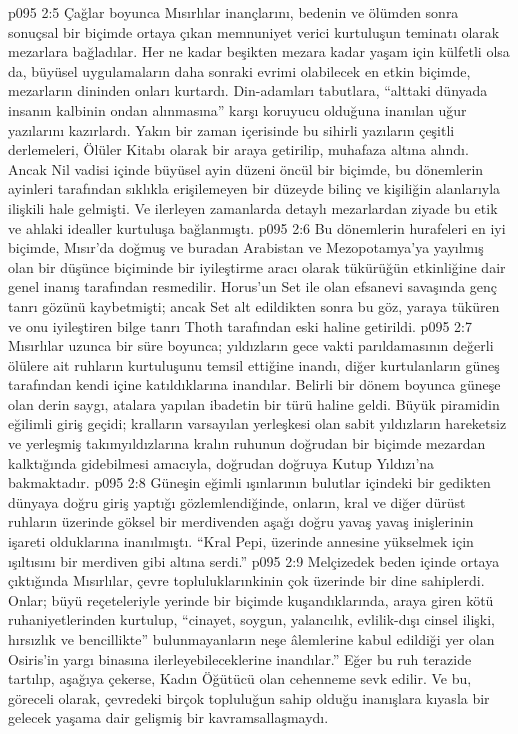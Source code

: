 \vs p095 2:5 Çağlar boyunca Mısırlılar inançlarını, bedenin ve ölümden sonra sonuçsal bir biçimde ortaya çıkan memnuniyet verici kurtuluşun teminatı olarak mezarlara bağladılar. Her ne kadar beşikten mezara kadar yaşam için külfetli olsa da, büyüsel uygulamaların daha sonraki evrimi olabilecek en etkin biçimde, mezarların dininden onları kurtardı. Din\hyp{}adamları tabutlara, “alttaki dünyada insanın kalbinin ondan alınmasına” karşı koruyucu olduğuna inanılan uğur yazılarını kazırlardı. Yakın bir zaman içerisinde bu sihirli yazıların çeşitli derlemeleri, Ölüler Kitabı olarak bir araya getirilip, muhafaza altına alındı. Ancak Nil vadisi içinde büyüsel ayin düzeni öncül bir biçimde, bu dönemlerin ayinleri tarafından sıklıkla erişilemeyen bir düzeyde bilinç ve kişiliğin alanlarıyla ilişkili hale gelmişti. Ve ilerleyen zamanlarda detaylı mezarlardan ziyade bu etik ve ahlaki idealler kurtuluşa bağlanmıştı.
\vs p095 2:6 Bu dönemlerin hurafeleri en iyi biçimde, Mısır’da doğmuş ve buradan Arabistan ve Mezopotamya’ya yayılmış olan bir düşünce biçiminde bir iyileştirme aracı olarak tükürüğün etkinliğine dair genel inanış tarafından resmedilir. Horus’un Set ile olan efsanevi savaşında genç tanrı gözünü kaybetmişti; ancak Set alt edildikten sonra bu göz, yaraya tüküren ve onu iyileştiren bilge tanrı Thoth tarafından eski haline getirildi.
\vs p095 2:7 Mısırlılar uzunca bir süre boyunca; yıldızların gece vakti parıldamasının değerli ölülere ait ruhların kurtuluşunu temsil ettiğine inandı, diğer kurtulanların güneş tarafından kendi içine katıldıklarına inandılar. Belirli bir dönem boyunca güneşe olan derin saygı, atalara yapılan ibadetin bir türü haline geldi. Büyük piramidin eğilimli giriş geçidi; kralların varsayılan yerleşkesi olan sabit yıldızların hareketsiz ve yerleşmiş takımyıldızlarına kralın ruhunun doğrudan bir biçimde mezardan kalktığında gidebilmesi amacıyla, doğrudan doğruya Kutup Yıldızı’na bakmaktadır.
\vs p095 2:8 Güneşin eğimli ışınlarının bulutlar içindeki bir gedikten dünyaya doğru giriş yaptığı gözlemlendiğinde, onların, kral ve diğer dürüst ruhların üzerinde göksel bir merdivenden aşağı doğru yavaş yavaş inişlerinin işareti olduklarına inanılmıştı. “Kral Pepi, üzerinde annesine yükselmek için ışıltısını bir merdiven gibi altına serdi.”
\vs p095 2:9 Melçizedek beden içinde ortaya çıktığında Mısırlılar, çevre topluluklarınkinin çok üzerinde bir dine sahiplerdi. Onlar; büyü reçeteleriyle yerinde bir biçimde kuşandıklarında, araya giren kötü ruhaniyetlerinden kurtulup, “cinayet, soygun, yalancılık, evlilik\hyp{}dışı cinsel ilişki, hırsızlık ve bencillikte” bulunmayanların neşe âlemlerine kabul edildiği yer olan Osiris’in yargı binasına ilerleyebileceklerine inandılar.” Eğer bu ruh terazide tartılıp, aşağıya çekerse, Kadın Öğütücü olan cehenneme sevk edilir. Ve bu, göreceli olarak, çevredeki birçok topluluğun sahip olduğu inanışlara kıyasla bir gelecek yaşama dair gelişmiş bir kavramsallaşmaydı.
